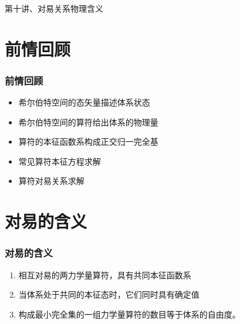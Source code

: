 \begin{frame}
    \frametitle{}
    \begin{center}
    { {\huge 第十讲、对易关系物理含义}}
    \end{center}    
\end{frame}


\section{前情回顾}

\begin{frame}
    \frametitle{前情回顾}
    \begin{itemize}
        \item 希尔伯特空间的态矢量描述体系状态
        \item 希尔伯特空间的算符给出体系的物理量
        \item 算符的本征函数系构成正交归一完全基
        \item 常见算符本征方程求解
        \item 算符对易关系求解
    \end{itemize}   
\end{frame} 

\section{对易的含义}
\begin{frame} 
    \frametitle{对易的含义}
    \begin{enumerate}
        \item  相互对易的两力学量算符，具有共同本征函数系
        \item  当体系处于共同的本征态时，它们同时具有确定值
        \item  构成最小完全集的一组力学量算符的数目等于体系的自由度。
    \end{enumerate}
\end{frame} 

